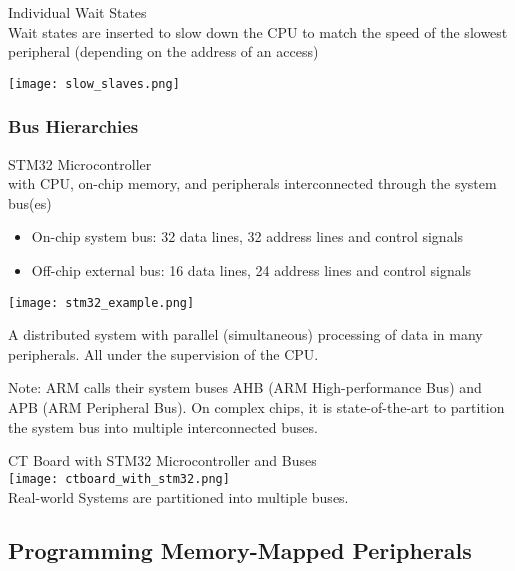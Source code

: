 \begin{KR}{Individual Wait States}\\
    Wait states are inserted to slow down the CPU to match the speed of the slowest peripheral (depending on the address of an access)

    \texttt{[image: slow\_slaves.png]}    
\end{KR}

\subsubsection{Bus Hierarchies}

\begin{example2}{STM32 Microcontroller}\\
    with CPU, on-chip memory, and peripherals interconnected through the system bus(es)
    \begin{itemize}
        \item On-chip system bus: 32 data lines, 32 address lines and control signals
        \item Off-chip external bus: 16 data lines, 24 address lines and control signals
    \end{itemize}
    \texttt{[image: stm32\_example.png]}

    A distributed system with parallel (simultaneous) processing of data in many peripherals. All under the supervision of the CPU.
\end{example2}

\begin{remark}
    Note: ARM calls their system buses AHB (ARM High-performance Bus) and APB (ARM
    Peripheral Bus). On complex chips, it is state-of-the-art to partition the system bus into
    multiple interconnected buses.
\end{remark}

\begin{example2}{CT Board with STM32 Microcontroller and Buses}\\
    \texttt{[image: ctboard\_with\_stm32.png]}\\
    Real-world Systems are partitioned into multiple buses.
\end{example2}

\columnbreak

\subsection{Programming Memory-Mapped Peripherals}

